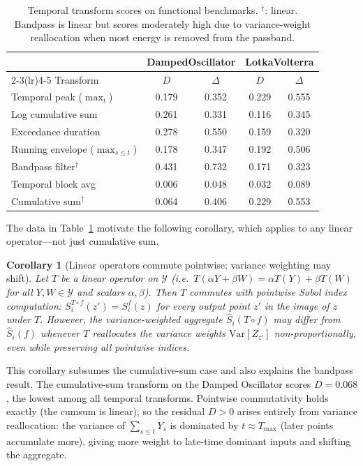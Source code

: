 \documentclass[11pt,onecolumn]{article}
\newtheorem{corollary}{Corollary}[proposition]
\begin{document}
\begin{table}[H]
\centering
\caption{Temporal transform scores on functional benchmarks. ${}^\dagger$: linear.
Bandpass is linear but scores moderately high due to variance-weight reallocation
when most energy is removed from the passband.}
\label{tab:temporal}
\small
\begin{tabular}{lcccc}
\toprule
& \multicolumn{2}{c}{DampedOscillator} & \multicolumn{2}{c}{LotkaVolterra} \\
\cmidrule(lr){2-3}\cmidrule(lr){4-5}
Transform & $D$ & $\Delta$ & $D$ & $\Delta$ \\
\midrule
Temporal peak ($\max_t$) & 0.179 & 0.352 & 0.229 & 0.555 \\
Log cumulative sum & 0.261 & 0.331 & 0.116 & 0.345 \\
Exceedance duration & 0.278 & 0.550 & 0.159 & 0.320 \\
Running envelope ($\max_{s\leq t}$) & 0.178 & 0.347 & 0.192 & 0.506 \\
Bandpass filter${}^\dagger$ & 0.431 & 0.732 & 0.171 & 0.323 \\
Temporal block avg & 0.006 & 0.048 & 0.032 & 0.089 \\
Cumulative sum${}^\dagger$ & 0.064 & 0.406 & 0.229 & 0.553 \\
\bottomrule
\end{tabular}
\end{table}

The data in Table~\ref{tab:temporal} motivate the following corollary, which
applies to any linear operator—not just cumulative sum.

\begin{corollary}[Linear operators commute pointwise; variance weighting may shift]
\label{cor:linear}
Let $T$ be a linear operator on $\mathcal{Y}$ (i.e.\ $T(\alpha Y + \beta W)
= \alpha T(Y) + \beta T(W)$ for all $Y, W \in \mathcal{Y}$ and scalars
$\alpha, \beta$).  Then $T$ commutes with \emph{pointwise} Sobol index
computation: $S_i^{T \circ f}(z') = S_i^f(z)$ for every output point $z'$
in the image of $z$ under $T$.
However, the variance-weighted aggregate $\hat{S}_i(T \circ f)$ may differ
from $\hat{S}_i(f)$ whenever $T$ reallocates the variance weights
$\mathrm{Var}[Z_{z'}]$ non-proportionally, even while preserving all
pointwise indices.
\end{corollary}

This corollary subsumes the cumulative-sum case and also explains the bandpass
result.  The cumulative-sum transform on the Damped Oscillator scores $D = 0.068$,
the lowest among all temporal transforms.  Pointwise commutativity holds exactly
(the cumsum is linear), so the residual $D > 0$ arises entirely from variance
reallocation: the variance of $\sum_{s\leq t} Y_s$ is dominated by
$t \approx T_{\max}$ (later points accumulate more), giving more weight to
late-time dominant inputs and shifting the aggregate.
\end{document}
